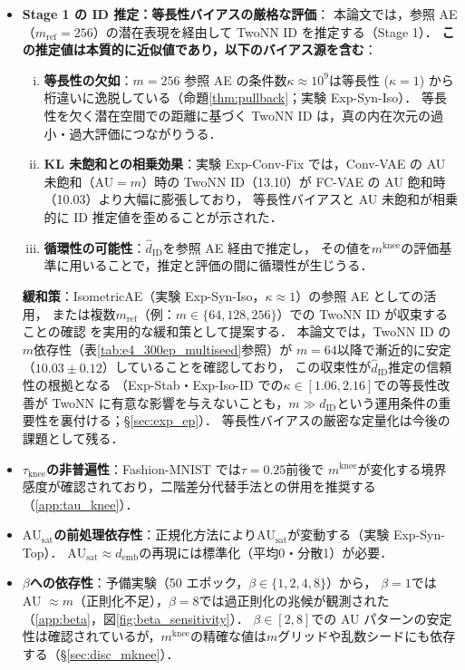 \documentclass[11pt,a4paper]{jsarticle}
\newcommand{\kap}{\kappa}
\newcommand{\AUsat}{\mathrm{AU}_{\mathrm{sat}}}
\newcommand{\mknee}{m^{\mathrm{knee}}}
\newcommand{\demb}{d_{\mathrm{emb}}}
\begin{document}
\begin{itemize}
  \item \textbf{Stage 1 の ID 推定：等長性バイアスの厳格な評価}：
        本論文では，参照 AE（$m_\mathrm{ref}=256$）の潜在表現を経由して TwoNN ID を推定する（Stage 1）．
        \textbf{この推定値は本質的に近似値であり，以下のバイアス源を含む}：
        \begin{enumerate}[(i)]
          \item \textbf{等長性の欠如}：$m=256$ 参照 AE の条件数$\kap \approx 10^9$は等長性
                ($\kap=1$) から桁違いに逸脱している（命題\ref{thm:pullback}；実験 Exp-Syn-Iso）．
                等長性を欠く潜在空間での距離に基づく TwoNN ID は，真の内在次元の過小・過大評価につながりうる．
          \item \textbf{KL 未飽和との相乗効果}：実験 Exp-Conv-Fix では，Conv-VAE の AU 未飽和（AU$=m$）時の
                TwoNN ID（13.10）が FC-VAE の AU 飽和時（10.03）より大幅に膨張しており，
                等長性バイアスと AU 未飽和が相乗的に ID 推定値を歪めることが示された．
          \item \textbf{循環性の可能性}：$\hat{d}_\mathrm{ID}$を参照 AE 経由で推定し，
                その値を$\mknee$の評価基準に用いることで，推定と評価の間に循環性が生じうる．
        \end{enumerate}
        \textbf{緩和策}：IsometricAE（実験 Exp-Syn-Iso，$\kap \approx 1$）の参照 AE としての活用，
        または複数$m_\mathrm{ref}$（例：$m \in \{64, 128, 256\}$）での TwoNN ID が収束することの確認
        を実用的な緩和策として提案する．
        本論文では，TwoNN ID の$m$依存性（表\ref{tab:e4_300ep_multiseed}参照）が
        $m=64$以降で漸近的に安定（$10.03 \pm 0.12$）していることを確認しており，
        この収束性が$\hat{d}_\mathrm{ID}$推定の信頼性の根拠となる
        （Exp-Stab・Exp-Iso-ID での$\kap \in [1.06, 2.16]$での等長性改善が TwoNN に有意な影響を与えないことも，$m \gg d_\mathrm{ID}$という運用条件の重要性を裏付ける；§\ref{sec:exp_ep}）．
        等長性バイアスの厳密な定量化は今後の課題として残る．
  \item \textbf{$\tau_{\mathrm{knee}}$の非普遍性}：Fashion-MNIST では$\tau = 0.25$前後で
        $\mknee$が変化する境界感度が確認されており，二階差分代替手法との併用を推奨する
        （\ref{app:tau_knee}）．
  \item \textbf{$\AUsat$の前処理依存性}：正規化方法により$\AUsat$が変動する（実験 Exp-Syn-Top）．
        $\AUsat \approx \demb$の再現には標準化（平均0・分散1）が必要．
  \item \textbf{$\beta$への依存性}：予備実験（50 エポック，$\beta \in \{1,2,4,8\}$）から，
        $\beta = 1$では AU $\approx m$（正則化不足），$\beta = 8$では過正則化の兆候が観測された
        （\ref{app:beta}，図\ref{fig:beta_sensitivity}）．
        $\beta \in [2, 8]$での AU パターンの安定性は確認されているが，$\mknee$の精確な値は$m$グリッドや乱数シードにも依存する（§\ref{sec:disc_mknee}）．
\end{itemize}
\end{document}
